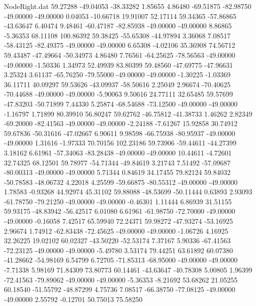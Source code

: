 \begin{filecontents}{NodeRight.dat}
  59.27288  -49.04053  -38.33282     1.85655    4.86480  -69.51875  -82.98750  -49.00000  -49.00000    0.04053  -10.66718   19.91007   52.17114
  59.34365  -57.86865  -43.63647     6.40474    9.48461  -60.47187  -82.85938  -49.00000  -49.00000    8.86865   -5.36353   68.11108  100.86392
  59.38425  -55.65308  -44.97894     3.36068    7.08517  -58.43125  -82.49375  -49.00000  -49.00000    6.65308   -4.02106   35.36908   74.56712
  59.43487  -47.49664  -50.34973     4.86480    7.76561  -64.25625  -78.56563  -49.00000  -49.00000   -1.50336    1.34973   52.49939   83.80399
  59.48560  -47.69775  -47.96631     3.25324    3.61137  -65.76250  -79.55000  -49.00000  -49.00000   -1.30225   -1.03369   36.11711   40.09297
  59.53626  -43.09937  -58.50616     2.25049    2.96674  -70.40625  -70.44688  -49.00000  -49.00000   -5.90063    9.50616   24.77111   32.65485
  59.57699  -47.83203  -50.71899     7.44330    5.25874  -68.54688  -73.12500  -49.00000  -49.00000   -1.16797    1.71899   80.39910   56.80247
  59.62762  -46.75812  -41.38733     1.46262    2.82349  -69.20000  -82.41563  -49.00000  -49.00000   -2.24188   -7.61267   15.92858   30.74912
  59.67836  -50.31616  -47.02667     6.90611    9.98598  -66.75938  -80.95937  -49.00000  -49.00000    1.31616   -1.97333   70.70156  102.23186
  59.73906  -59.44611  -44.27399     3.18162    6.61961  -57.34063  -83.28438  -49.00000  -49.00000   10.44611   -4.72601   32.74325   68.12501
  59.78977  -54.71344  -49.84619     3.21743    7.51492  -57.09687  -80.00313  -49.00000  -49.00000    5.71344    0.84619   34.17455   79.82124
  59.84032  -50.78583  -48.06732     4.22018    4.25599  -59.66875  -80.55312  -49.00000  -49.00000    1.78583   -0.93268   44.92974   45.31102
  59.88088  -48.53699  -50.11444     0.63893    2.93093  -61.78750  -79.21250  -49.00000  -49.00000   -0.46301    1.11444    6.86939   31.51155
  59.93175  -48.83942  -56.42517     6.01080    6.61961  -61.98750  -72.70000  -49.00000  -49.00000   -0.16058    7.42517   65.59940   72.24371
  59.98272  -47.93274  -53.16925     2.96674    1.74912  -62.83438  -72.45625  -49.00000  -49.00000   -1.06726    4.16925   32.26225   19.02102
  60.02327  -43.50220  -52.53174     7.37167    5.90336  -67.41563  -72.23125  -49.00000  -49.00000   -5.49780    3.53174   79.44251   63.61892
  60.07380  -41.28662  -54.98169     6.54799    6.72705  -71.85313  -68.95000  -49.00000  -49.00000   -7.71338    5.98169   71.84309   73.80773
  60.14461  -43.63647  -40.78308     5.00805    1.96399  -72.41563  -79.89062  -49.00000  -49.00000   -5.36353   -8.21692   53.68262   21.05255
  60.18540  -51.55792  -48.87299     4.75736    7.08517  -66.38750  -77.08125  -49.00000  -49.00000    2.55792   -0.12701   50.75013   75.58250

\end{filecontents}
